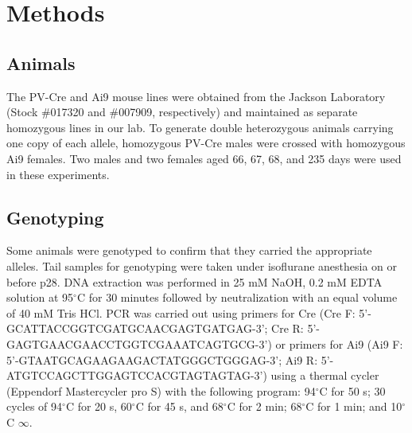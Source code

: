 \section{Methods}
\subsection{Animals} The PV-Cre and Ai9 mouse lines were obtained from the Jackson Laboratory (Stock \#017320 and \#007909, respectively) and maintained as separate homozygous lines in our lab.  To generate double heterozygous animals carrying one copy of each allele, homozygous PV-Cre males were crossed with homozygous Ai9 females. Two males and two females aged 66, 67, 68, and 235 days were used in these experiments. 

\subsection{Genotyping} Some animals were genotyped to confirm that they carried the appropriate alleles. Tail samples for genotyping were taken under isoflurane anesthesia on or before p28.  DNA extraction was performed in 25 mM NaOH, 0.2 mM EDTA solution at 95$^\circ$C for 30 minutes followed by neutralization with an equal volume of 40 mM Tris HCl.  PCR was carried out using primers for Cre (Cre F: 5'-GCATTA\-CCG\-GTC\-GAT\-GCA\-ACG\-AGT\-GATGAG-3'; Cre R: 5'-GAGTGA\-ACG\-AAC\-CTG\-GTC\-GAA\-ATC\-AGTGCG-3') or primers for Ai9 (Ai9 F: 5'-GTAATG\-CAG\-AAG\-AAG\-ACT\-ATG\-GGC\-TGGGAG-3'; Ai9 R: 5'-ATGTCC\-AGC\-TTG\-GAG\-TCC\-ACG\-TAG\-TAGTAG-3') using a thermal cycler (Eppendorf Mastercycler pro S) with the following program: 94$^\circ$C for 50 s; 30 cycles of 94$^\circ$C for 20 s, 60$^\circ$C for 45 s, and 68$^\circ$C for 2 min; 68$^\circ$C for 1 min; and 10$^\circ$C $\infty$.

